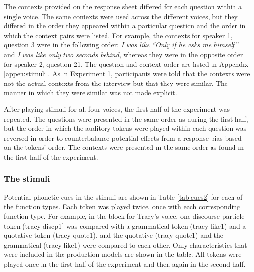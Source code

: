 The contexts provided on the response sheet differed for each question within a single voice.  The same contexts were used across the different voices, but they differed in the order they appeared within a particular question and the order in which the context pairs were listed.  For example, the contexts for speaker 1, question 3 were in the following order: \textit{I was like ``Only if he asks me himself''} and \textit{I was like only two seconds behind}, whereas they were in the opposite order for speaker 2, question 21.  The question and context order are listed in Appendix \ref{appen:stimuli}.  As in Experiment 1, participants were told that the contexts were not the actual contexts from the interview but that they were similar.  The manner in which they were similar was not made explicit.

After playing stimuli for all four voices, the first half of the experiment was repeated.  The questions were presented in the same order as during the first half, but the order in which the auditory tokens were played within each question was reversed in order to counterbalance potential effects from a response bias based on the tokens' order.  The contexts were presented in the same order as found in the first half of the experiment.


\subsubsection{The stimuli}

Potential phonetic cues in the stimuli are shown in Table \ref{tab:cues2} for each of the function types.  Each token was played twice, once with each corresponding function type.  For example, in the block for Tracy's voice, one discourse particle token (tracy-discp1) was compared with a grammatical token (tracy-like1) and a quotative token (tracy-quote1), and the quotative (tracy-quote1) and the grammatical (tracy-like1) were compared to each other.  Only characteristics that were included in the production models are shown in the table.  All tokens were played once in the first half of the experiment and then again in the second half.  

